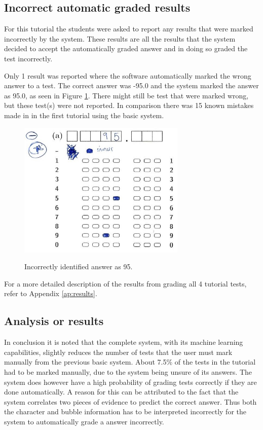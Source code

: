 \subsection{Incorrect automatic graded results}

For this tutorial the students were asked to report any results that were marked incorrectly by the system. These results are all the results that the system decided to accept the automatically graded answer and in doing so graded the test incorrectly.

Only 1 result was reported where the software automatically marked the wrong answer to a test. The correct answer was -95.0 and the system marked the answer as 95.0, as seen in Figure \ref{fig:wrongAns}. There might still be test that were marked wrong, but these test(s) were not reported. In comparison there was 15 known mistakes made in in the first tutorial using the basic system.

\begin{figure}
  \centering
  \includegraphics[width=8cm]{wrongResult}\\
  \caption{Incorrectly identified answer as 95.}
  \label{fig:wrongAns}
\end{figure}

For a more detailed description of the results from grading all 4 tutorial tests, refer to Appendix \ref{ap:results}.

\subsection{Analysis or results}

In conclusion it is noted that the complete system, with its machine learning capabilities, slightly reduces the number of tests that the user must mark manually from the previous basic system. About 7.5\% of the tests in the tutorial had to be marked manually, due to the system being unsure of its answers. The system does however have a high probability of grading tests correctly if they are done automatically. A reason for this can be attributed to the fact that the system correlates two pieces of evidence to predict the correct answer. Thus both the character and bubble information has to be interpreted incorrectly for the system to automatically grade a answer incorrectly. 

